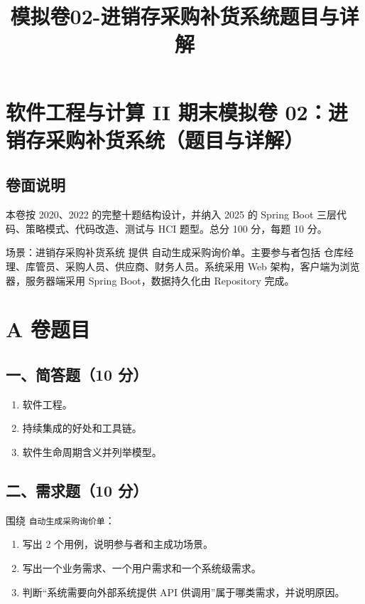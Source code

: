 \documentclass[UTF8,zihao=-4]{ctexart}
\title{模拟卷02-进销存采购补货系统题目与详解}
\author{}
\date{}
\begin{document}
\maketitle
\setcounter{tocdepth}{1}
\tableofcontents
\newpage
\section{软件工程与计算 II 期末模拟卷 02：进销存采购补货系统（题目与详解）}


\subsection{卷面说明}


本卷按 2020、2022 的完整十题结构设计，并纳入 2025 的 Spring Boot 三层代码、策略模式、代码改造、测试与 HCI 题型。总分 100 分，每题 10 分。


场景：进销存采购补货系统 提供 自动生成采购询价单。主要参与者包括 仓库经理、库管员、采购人员、供应商、财务人员。系统采用 Web 架构，客户端为浏览器，服务器端采用 Spring Boot，数据持久化由 Repository 完成。


\section{A 卷题目}


\subsection{一、简答题（10 分）}


\begin{enumerate}
\item 软件工程。
\item 持续集成的好处和工具链。
\item 软件生命周期含义并列举模型。
\end{enumerate}


\subsection{二、需求题（10 分）}


围绕 \texttt{自动生成采购询价单}：


\begin{enumerate}
\item 写出 2 个用例，说明参与者和主成功场景。
\item 写出一个业务需求、一个用户需求和一个系统级需求。
\item 判断“系统需要向外部系统提供 API 供调用”属于哪类需求，并说明原因。
\end{enumerate}
\end{document}
